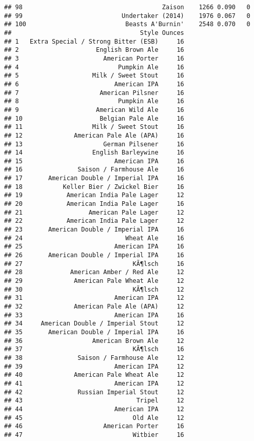 \documentclass[
]{article}
\begin{document}
\begin{verbatim}
## 98                                      Zaison    1266 0.090   0
## 99                           Undertaker (2014)    1976 0.067   0
## 100                           Beasts A'Burnin'    2548 0.070   0
##                                   Style Ounces
## 1   Extra Special / Strong Bitter (ESB)     16
## 2                     English Brown Ale     16
## 3                       American Porter     16
## 4                           Pumpkin Ale     16
## 5                    Milk / Sweet Stout     16
## 6                          American IPA     16
## 7                      American Pilsner     16
## 8                           Pumpkin Ale     16
## 9                     American Wild Ale     16
## 10                     Belgian Pale Ale     16
## 11                   Milk / Sweet Stout     16
## 12              American Pale Ale (APA)     16
## 13                      German Pilsener     16
## 14                   English Barleywine     16
## 15                         American IPA     16
## 16               Saison / Farmhouse Ale     16
## 17       American Double / Imperial IPA     16
## 18           Keller Bier / Zwickel Bier     16
## 19            American India Pale Lager     12
## 20            American India Pale Lager     16
## 21                  American Pale Lager     12
## 22            American India Pale Lager     12
## 23       American Double / Imperial IPA     16
## 24                            Wheat Ale     16
## 25                         American IPA     16
## 26       American Double / Imperial IPA     16
## 27                              KÃ¶lsch     16
## 28             American Amber / Red Ale     12
## 29              American Pale Wheat Ale     12
## 30                              KÃ¶lsch     12
## 31                         American IPA     12
## 32              American Pale Ale (APA)     12
## 33                         American IPA     16
## 34     American Double / Imperial Stout     12
## 35       American Double / Imperial IPA     16
## 36                   American Brown Ale     12
## 37                              KÃ¶lsch     16
## 38               Saison / Farmhouse Ale     12
## 39                         American IPA     12
## 40              American Pale Wheat Ale     12
## 41                         American IPA     12
## 42               Russian Imperial Stout     12
## 43                               Tripel     12
## 44                         American IPA     12
## 45                              Old Ale     12
## 46                      American Porter     16
## 47                              Witbier     16

\end{verbatim}
\end{document}
